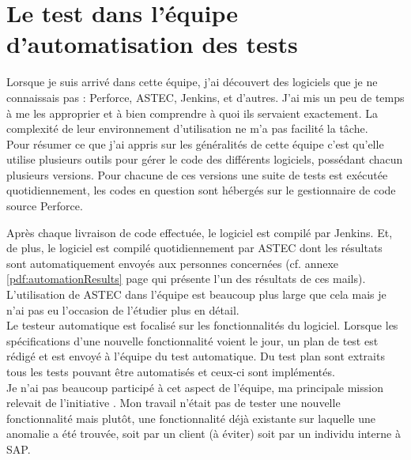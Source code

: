 \section{Le test dans l'\'{e}quipe d'automatisation des tests}
Lorsque je suis arriv\'{e} dans cette \'{e}quipe, j'ai d\'{e}couvert des logiciels que je ne connaissais pas : Perforce, ASTEC, Jenkins, et d'autres. J'ai mis un peu de temps \`{a} me les approprier et \`{a} bien comprendre \`{a} quoi ils servaient exactement. La complexit\'{e} de leur environnement d'utilisation ne m'a pas facilit\'{e} la t\^{a}che.\\

Pour r\'{e}sumer ce que j'ai appris sur les g\'{e}n\'{e}ralit\'{e}s de cette \'{e}quipe c'est qu'elle utilise plusieurs outils pour g\'{e}rer le code des diff\'{e}rents logiciels, poss\'{e}dant chacun plusieurs versions. Pour chacune de ces versions une suite de tests est ex\'{e}cut\'{e}e quotidiennement, les codes en question sont h\'{e}berg\'{e}s sur le gestionnaire de code source Perforce. 

Apr\`{e}s chaque livraison de code effectu\'{e}e, le logiciel est compil\'{e} par Jenkins. Et, de plus, le logiciel est compil\'{e} quotidiennement par ASTEC dont les r\'{e}sultats sont automatiquement envoy\'{e}s aux personnes concern\'{e}es (cf. annexe \ref{pdf:automationResults} page \pageref{pdf:automationResults} qui pr\'{e}sente l'un des r\'{e}sultats de ces mails). L'utilisation de ASTEC dans l'\'{e}quipe est beaucoup plus large que cela mais je n'ai pas eu l'occasion de l'\'{e}tudier plus en d\'{e}tail.\\



Le testeur automatique est focalis\'{e} sur les fonctionnalit\'{e}s du logiciel. Lorsque les sp\'{e}cifications d'une nouvelle fonctionnalit\'{e} voient le jour, un plan de test est r\'{e}dig\'{e} et est envoy\'{e} \`{a} l'\'{e}quipe du test automatique. Du test plan sont extraits tous les tests pouvant \^{e}tre automatis\'{e}s et ceux-ci sont impl\'{e}ment\'{e}s.\\
Je n'ai pas beaucoup particip\'{e} \`{a} cet aspect de l'\'{e}quipe, ma principale mission relevait de l'initiative . Mon travail n'\'{e}tait pas de tester une nouvelle fonctionnalit\'{e} mais plut\^{o}t, une fonctionnalit\'{e} d\'{e}j\`{a} existante sur laquelle une anomalie a \'{e}t\'{e} trouv\'{e}e, soit par un client (\`{a} \'{e}viter) soit par un individu interne \`{a} SAP.\\

